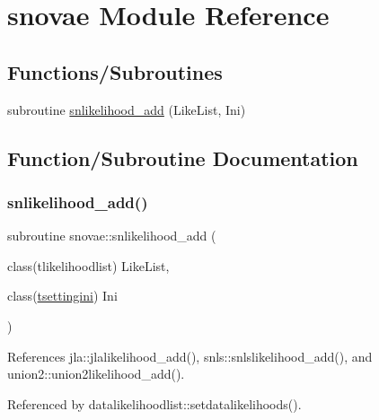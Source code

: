 \hypertarget{namespacesnovae}{}\section{snovae Module Reference}
\label{namespacesnovae}
\subsection*{Functions/\+Subroutines}
\begin{DoxyCompactItemize}
\item 
subroutine \mbox{\hyperlink{namespacesnovae_adb4b4cd7d74239d328c3ab34bb17b6eb}{snlikelihood\+\_\+add}} (Like\+List, Ini)
\end{DoxyCompactItemize}


\subsection{Function/\+Subroutine Documentation}
\mbox{\label{namespacesnovae_adb4b4cd7d74239d328c3ab34bb17b6eb}} 
\subsubsection{\texorpdfstring{snlikelihood\+\_\+add()}{snlikelihood\_add()}}
{\footnotesize\ttfamily subroutine snovae\+::snlikelihood\+\_\+add (\begin{DoxyParamCaption}\item[{class(tlikelihoodlist)}]{Like\+List,  }\item[{class(\mbox{\hyperlink{structsettings_1_1tsettingini}{tsettingini}})}]{Ini }\end{DoxyParamCaption})}



References jla\+::jlalikelihood\+\_\+add(), snls\+::snlslikelihood\+\_\+add(), and union2\+::union2likelihood\+\_\+add().



Referenced by datalikelihoodlist\+::setdatalikelihoods().

